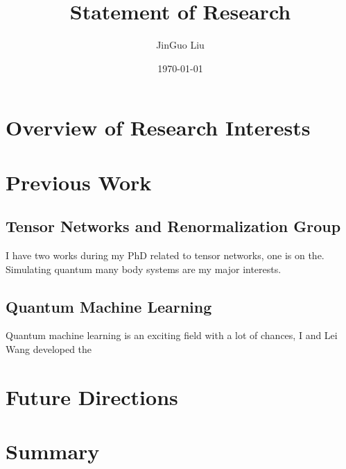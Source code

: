 \documentclass[a4paper]{article}
\title{Statement of Research}
\author{JinGuo Liu}
\date{\today}
\newcommand{\<}{\langle}
\renewcommand{\>}{\rangle}
\begin{document}
\fontsize{10}{13}
\selectfont
\maketitle

\section{Overview of Research Interests}

\section{Previous Work}
\subsection{Tensor Networks and Renormalization Group}
I have two works during my PhD related to tensor networks, one is on the.
Simulating quantum many body systems are my major interests.

\subsection{Quantum Machine Learning}
Quantum machine learning is an exciting field with a lot of chances, I and Lei Wang developed the 

\section{Future Directions}\label{proposal}
\section{Summary}
%


\end{document}
